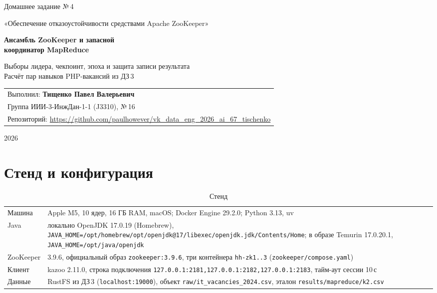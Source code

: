 \documentclass[11pt,a4paper]{article}
\newcommand{\code}[1]{\texttt{#1}}
\begin{document}
\begin{titlepage}
  \centering
  \vspace*{15mm}
  {\large Домашнее задание №\,4\par}
  {\large «Обеспечение отказоустойчивости средствами Apache ZooKeeper»\par}
  \vspace{40mm}
  {\LARGE\bfseries Ансамбль ZooKeeper и запасной\\[4pt] координатор MapReduce\par}
  \vspace{8mm}
  {\normalsize Выборы лидера, чекпоинт, эпоха и защита записи результата\\ Расчёт пар навыков PHP-вакансий из ДЗ\,3\par}
  \vfill
  \begin{flushright}
    \begin{tabular}{@{}l@{}}
      Выполнил: \textbf{Тищенко Павел Валерьевич}\\
      Группа ИИИ-3-ИнжДан-1-1 (J3310), №\,16\\
      Репозиторий: \url{https://github.com/paulhowever/vk_data_eng_2026_ai_67_tischenko}
    \end{tabular}
  \end{flushright}
  \vspace{25mm}
  {2026\par}
\end{titlepage}


\section{Стенд и конфигурация}

\begin{table}[H]
\centering
\small
\caption{Стенд}
\begin{tabularx}{\linewidth}{@{}lL@{}}
\toprule
Машина & Apple M5, 10 ядер, 16 ГБ RAM, macOS; Docker Engine 29.2.0; Python 3.13, uv \\
Java & локально OpenJDK 17.0.19 (Homebrew), \code{JAVA\_HOME=/opt/homebrew/opt/openjdk@17/libexec/openjdk.jdk/Contents/Home}; в образе Temurin 17.0.20.1, \code{JAVA\_HOME=/opt/java/openjdk} \\
ZooKeeper & 3.9.6, официальный образ \code{zookeeper:3.9.6}, три контейнера \code{hh-zk1..3} (\code{zookeeper/compose.yaml}) \\
Клиент & kazoo 2.11.0, строка подключения \code{127.0.0.1:2181,127.0.0.1:2182,127.0.0.1:2183}, тайм-аут сессии 10\,с \\
Данные & RustFS из ДЗ\,3 (\code{localhost:19000}), объект \code{raw/it\_vacancies\_2024.csv}, эталон \code{results/mapreduce/k2.csv} \\
\bottomrule
\end{tabularx}
\end{table}
\end{document}
